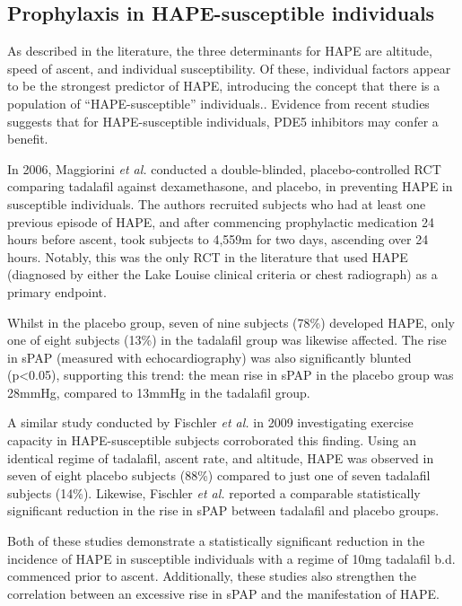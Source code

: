 \documentclass[12pt,a4paper]{article}
\begin{document}
\subsection*{Prophylaxis in HAPE-susceptible individuals}

As described in the literature, the three determinants for HAPE are altitude, speed of ascent, and individual susceptibility.\cite{Bartsch:2001kc,Bartsch:2002cg,Dehnert:2005ca} Of these, individual factors appear to be the strongest predictor of HAPE,\cite{Bartsch:2002cg} introducing the concept that there is a population of ``HAPE-susceptible'' individuals.\cite{Bartsch:2001kc,Dehnert:2005ca}. Evidence from recent studies suggests that for HAPE-susceptible individuals, PDE5 inhibitors may confer a benefit.

In 2006, Maggiorini \emph{et al.} conducted a double-blinded, placebo-controlled RCT comparing tadalafil against dexamethasone, and placebo, in preventing HAPE in susceptible individuals.\cite{Maggiorini:2006kz} The authors recruited subjects who had at least one previous episode of HAPE, and after commencing prophylactic medication 24 hours before ascent, took subjects to 4,559m for two days, ascending over 24 hours. Notably, this was the only RCT in the literature that used HAPE (diagnosed by either the Lake Louise clinical criteria\cite{Sutton:1991wx} or chest radiograph) as a primary endpoint.

Whilst in the placebo group, seven of nine subjects (78\%) developed HAPE, only one of eight subjects (13\%) in the tadalafil group was likewise affected. The rise in sPAP (measured with echocardiography) was also significantly blunted (p<0.05), supporting this trend: the mean rise in sPAP in the placebo group was 28mmHg, compared to 13mmHg in the tadalafil group.\cite{Maggiorini:2006kz}

A similar study conducted by Fischler \emph{et al.} in 2009 investigating exercise capacity in HAPE-susceptible subjects corroborated this finding. Using an identical regime of tadalafil, ascent rate, and altitude, HAPE was observed in seven of eight placebo subjects (88\%) compared to just one of seven tadalafil subjects (14\%). Likewise, Fischler \emph{et al.} reported a comparable statistically significant reduction in the rise in sPAP between tadalafil and placebo groups.\cite{Fischler:2009ce}

Both of these studies demonstrate a statistically significant reduction in the incidence of HAPE in susceptible individuals with a regime of 10mg tadalafil b.d. commenced prior to ascent. Additionally, these studies also strengthen the correlation between an excessive rise in sPAP and the manifestation of HAPE.
\end{document}
